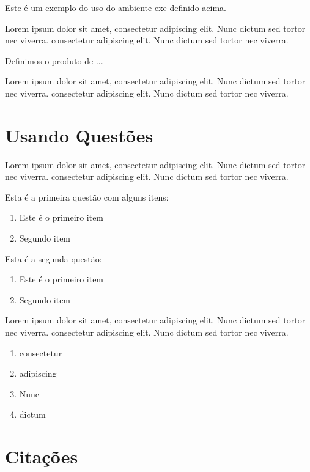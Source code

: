 \begin{exem}
	Este é um exemplo do uso do ambiente exe definido acima.
\end{exem}

Lorem ipsum dolor sit amet, consectetur adipiscing elit. Nunc dictum sed tortor nec viverra. consectetur adipiscing elit. Nunc dictum sed tortor nec viverra.

\begin{xdefinicao}
	Definimos o produto de ...
\end{xdefinicao}

Lorem ipsum dolor sit amet, consectetur adipiscing elit. Nunc dictum sed tortor nec viverra. consectetur adipiscing elit. Nunc dictum sed tortor nec viverra.

\section{Usando Questões}


Lorem ipsum dolor sit amet, consectetur adipiscing elit. Nunc dictum sed tortor nec viverra. consectetur adipiscing elit. Nunc dictum sed tortor nec viverra.

\begin{questao}
	\item Esta é a primeira questão com alguns itens:
		\begin{enumerate}
			\item Este é o primeiro item
			\item Segundo item
		\end{enumerate}
	\item Esta é a segunda questão:
		\begin{enumerate}
			\item Este é o primeiro item
			\item Segundo item
		\end{enumerate}
	\item Lorem ipsum dolor sit amet, consectetur adipiscing elit. Nunc dictum sed tortor nec viverra. consectetur adipiscing elit. Nunc dictum sed tortor nec viverra.
		\begin{enumerate}
			\item consectetur
			\item adipiscing
			\item Nunc
			\item dictum
		\end{enumerate}
\end{questao}

\section{Citações}

